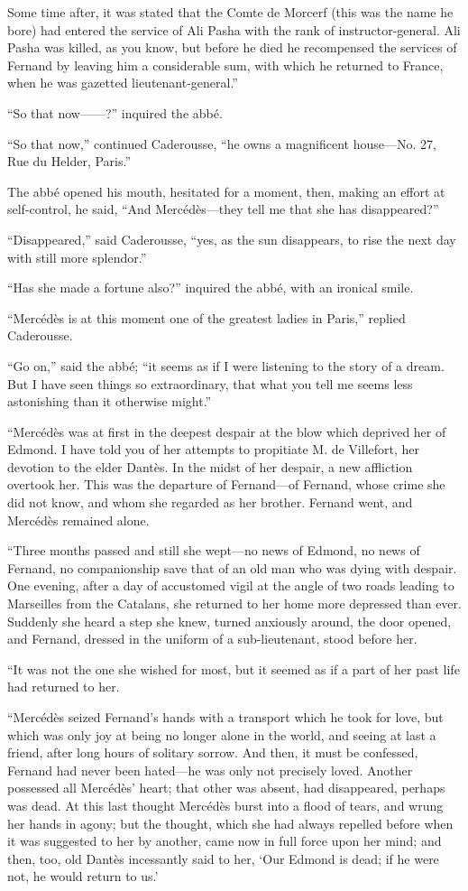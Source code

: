 Some time after, it was stated that the Comte de Morcerf (this was the
name he bore) had entered the service of Ali Pasha with the rank of
instructor-general. Ali Pasha was killed, as you know, but before he
died he recompensed the services of Fernand by leaving him a
considerable sum, with which he returned to France, when he was
gazetted lieutenant-general.”

“So that now——?” inquired the abbé.

“So that now,” continued Caderousse, “he owns a magnificent house—No.
27, Rue du Helder, Paris.”

The abbé opened his mouth, hesitated for a moment, then, making an
effort at self-control, he said, “And Mercédès—they tell me that she
has disappeared?”

“Disappeared,” said Caderousse, “yes, as the sun disappears, to rise
the next day with still more splendor.”

“Has she made a fortune also?” inquired the abbé, with an ironical
smile.

“Mercédès is at this moment one of the greatest ladies in Paris,”
replied Caderousse.

“Go on,” said the abbé; “it seems as if I were listening to the story
of a dream. But I have seen things so extraordinary, that what you tell
me seems less astonishing than it otherwise might.”

“Mercédès was at first in the deepest despair at the blow which
deprived her of Edmond. I have told you of her attempts to propitiate
M. de Villefort, her devotion to the elder Dantès. In the midst of her
despair, a new affliction overtook her. This was the departure of
Fernand—of Fernand, whose crime she did not know, and whom she regarded
as her brother. Fernand went, and Mercédès remained alone.

“Three months passed and still she wept—no news of Edmond, no news of
Fernand, no companionship save that of an old man who was dying with
despair. One evening, after a day of accustomed vigil at the angle of
two roads leading to Marseilles from the Catalans, she returned to her
home more depressed than ever. Suddenly she heard a step she knew,
turned anxiously around, the door opened, and Fernand, dressed in the
uniform of a sub-lieutenant, stood before her.

“It was not the one she wished for most, but it seemed as if a part of
her past life had returned to her.

“Mercédès seized Fernand’s hands with a transport which he took for
love, but which was only joy at being no longer alone in the world, and
seeing at last a friend, after long hours of solitary sorrow. And then,
it must be confessed, Fernand had never been hated—he was only not
precisely loved. Another possessed all Mercédès’ heart; that other was
absent, had disappeared, perhaps was dead. At this last thought
Mercédès burst into a flood of tears, and wrung her hands in agony; but
the thought, which she had always repelled before when it was suggested
to her by another, came now in full force upon her mind; and then, too,
old Dantès incessantly said to her, ‘Our Edmond is dead; if he were
not, he would return to us.’

